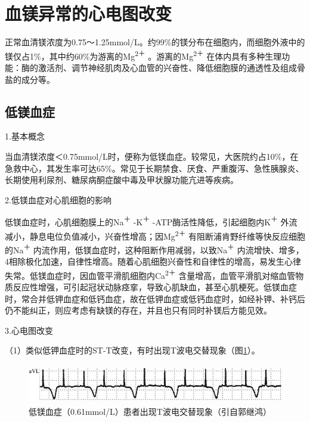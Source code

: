 \section{血镁异常的心电图改变}

正常血清镁浓度为0.75～1.25mmol/L。约99\%的镁分布在细胞内，而细胞外液中的镁仅占1\%，其中约60\%为游离的Mg\textsuperscript{2＋}
。游离的Mg\textsuperscript{2＋}
在体内具有多种生理功能：酶的激活剂、调节神经肌肉及心血管的兴奋性、降低细胞膜的通透性及组成骨盐的成分等。

\protect\hypertarget{text00053.htmlux5cux23subid643}{}{}

\subsection{低镁血症}

1.基本概念

当血清镁浓度＜0.75mmol/L时，便称为低镁血症。较常见，大医院约占10\%，在急救中心，其发生率可达65\%。常见于长期禁食、厌食、严重腹泻、急性胰腺炎、长期使用利尿剂、糖尿病酮症酸中毒及甲状腺功能亢进等疾病。

2.低镁血症对心肌细胞的影响

低镁血症时，心肌细胞膜上的Na\textsuperscript{＋} -K\textsuperscript{＋}
-ATP酶活性降低，引起细胞内K\textsuperscript{＋}
外流减小，静息电位负值减小，兴奋性增高；因Mg\textsuperscript{2＋}
有阻断浦肯野纤维等快反应细胞的Na\textsuperscript{＋}
内流作用，低镁血症时，这种阻断作用减弱，以致Na\textsuperscript{＋}
内流增快、增多，4相除极化加速，自律性增高。随着心肌细胞兴奋性和自律性的增高，易发生心律失常。低镁血症时，因血管平滑肌细胞内Ca\textsuperscript{2＋}
含量增高，血管平滑肌对缩血管物质反应性增强，可引起冠状动脉痉挛，导致心肌缺血，甚至心肌梗死。低镁血症时，常合并低钾血症和低钙血症，故在低钾血症或低钙血症时，如经补钾、补钙后仍不能纠正，则应考虑有缺镁的存在，并且也只有同时补镁后方能见效。

3.心电图改变

（1）类似低钾血症时的ST-T改变，有时出现T波电交替现象（图\ref{fig45-7}）。

\begin{figure}[!htbp]
 \centering
 \includegraphics[width=5.1875in,height=0.67708in]{./images/Image00735.jpg}
 \captionsetup{justification=centering}
 \caption{低镁血症（0.61mmol/L）患者出现T波电交替现象（引自郭继鸿）}
 \label{fig45-7}
  \end{figure} 

